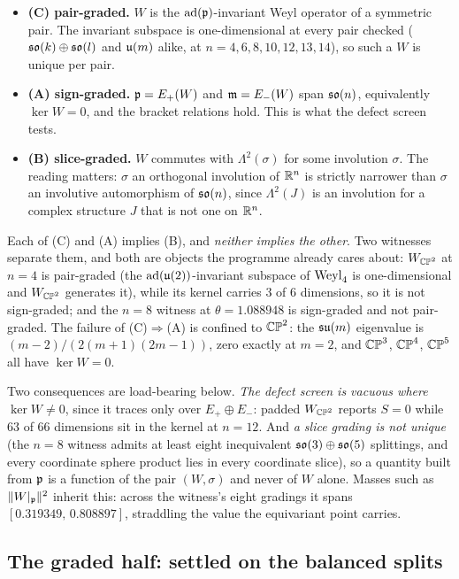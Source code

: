 \begin{itemize}
\item \textbf{(C) pair-graded.} $W$ is the $\mathrm{ad}(\mathfrak{p})$-invariant Weyl operator of a symmetric pair. The invariant subspace is one-dimensional at every pair checked ($\mathfrak{so}(k)\oplus\mathfrak{so}(l)$ and $\mathfrak{u}(m)$ alike, at $n=4,6,8,10,12,13,14$), so such a $W$ is unique per pair.
\item \textbf{(A) sign-graded.} $\mathfrak{p}=E_+(W)$ and $\mathfrak{m}=E_-(W)$ span $\mathfrak{so}(n)$, equivalently $\ker W=0$, and the bracket relations hold. This is what the defect screen tests.
\item \textbf{(B) slice-graded.} $W$ commutes with $\Lambda^2(\sigma)$ for some involution $\sigma$. The reading matters: $\sigma$ an orthogonal involution of $\mathbb{R}^n$ is strictly narrower than $\sigma$ an involutive automorphism of $\mathfrak{so}(n)$, since $\Lambda^2(J)$ is an involution for a complex structure $J$ that is not one on $\mathbb{R}^n$.
\end{itemize}

Each of (C) and (A) implies (B), and \emph{neither implies the other}. Two witnesses separate them, and both are objects the programme already cares about: $W_{\mathbb{CP}^2}$ at $n=4$ is pair-graded (the $\mathrm{ad}(\mathfrak{u}(2))$-invariant subspace of $\mathrm{Weyl}_4$ is one-dimensional and $W_{\mathbb{CP}^2}$ generates it), while its kernel carries $3$ of $6$ dimensions, so it is not sign-graded; and the $n=8$ witness at $\theta=1.088948$ is sign-graded and not pair-graded. The failure of (C)$\Rightarrow$(A) is confined to $\mathbb{CP}^2$: the $\mathfrak{su}(m)$ eigenvalue is $(m-2)/(2(m+1)(2m-1))$, zero exactly at $m=2$, and $\mathbb{CP}^3$, $\mathbb{CP}^4$, $\mathbb{CP}^5$ all have $\ker W=0$.

Two consequences are load-bearing below. \emph{The defect screen is vacuous where $\ker W\ne0$}, since it traces only over $E_+\oplus E_-$: padded $W_{\mathbb{CP}^2}$ reports $S=0$ while $63$ of $66$ dimensions sit in the kernel at $n=12$. And \emph{a slice grading is not unique} (the $n=8$ witness admits at least eight inequivalent $\mathfrak{so}(3)\oplus\mathfrak{so}(5)$ splittings, and every coordinate sphere product lies in every coordinate slice), so a quantity built from $\mathfrak{p}$ is a function of the pair $(W,\sigma)$ and never of $W$ alone. Masses such as $\|W|_{\mathfrak{p}}\|^2$ inherit this: across the witness's eight gradings it spans $[0.319349,\,0.808897]$, straddling the value the equivariant point carries.

\subsection{The graded half: settled on the balanced splits}\label{sec:gradedhalf}

